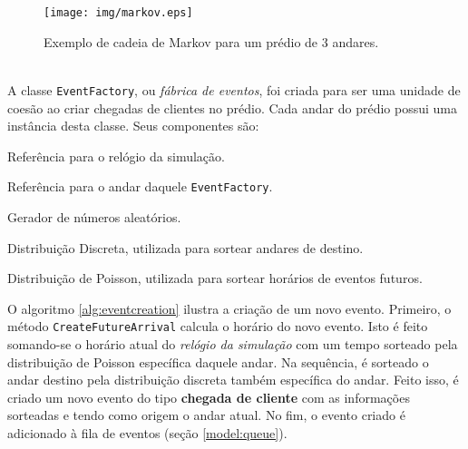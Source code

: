 \begin{description}
\begin{figure}[htb!]
  \centering
  \texttt{[image: img/markov.eps]}
  \caption{Exemplo de cadeia de Markov para um prédio de 3 andares.}
\label{fig:distribution:markov}
\end{figure}

\item[EventFactory] \label{model:eventfactory} \hfill \\
A classe \texttt{EventFactory}, ou \textit{fábrica de eventos}, foi criada para
ser uma unidade de coesão ao criar chegadas de clientes no prédio. Cada andar do
prédio possui uma instância desta classe. Seus componentes são:

  \begin{description}[leftmargin=!,labelwidth=\widthof{\bfseries hasNextEvent}]
    \item[\texttt{clock}] Referência para o relógio da simulação.
    \item[\texttt{floor}] Referência para o andar daquele \texttt{EventFactory}.
    \item[\texttt{random engine}] Gerador de números aleatórios.
    \item[\texttt{destination}] Distribuição Discreta, utilizada para sortear andares de destino.
    \item[\texttt{arrival}] Distribuição de Poisson, utilizada para sortear horários de eventos futuros.
  \end{description}

  O algoritmo \ref{alg:eventcreation} ilustra a criação de um novo evento.
  Primeiro, o método \texttt{CreateFutureArrival} calcula o horário do novo
  evento. Isto é feito somando-se o horário atual do \textit{relógio da
  simulação} com um tempo sorteado pela distribuição de Poisson específica
  daquele andar. Na sequência, é sorteado o andar destino pela distribuição
  discreta também específica do andar. Feito isso, é criado um novo evento do
  tipo \textbf{chegada de cliente} com as informações sorteadas e tendo como
  origem o andar atual. No fim, o evento criado é adicionado à fila de eventos
  (seção \ref{model:queue}).


\end{description}
